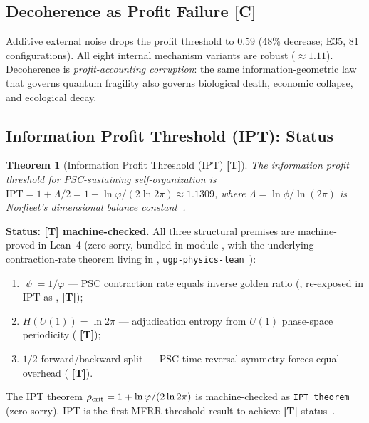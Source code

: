 \documentclass[11pt]{article}
\newcommand{\tagT}{\textbf{[T]}}
\newcommand{\tagC}{\textbf{[C]}}
\theoremstyle{plain}
\newtheorem{theorem}{Theorem}[section]
\theoremstyle{definition}
\theoremstyle{remark}
\begin{document}
\subsection{Decoherence as Profit Failure \tagC{}}

Additive external noise drops the profit threshold to 0.59 (48\% decrease; E35, 81 configurations).
All eight internal mechanism variants are robust ($\approx 1.11$).
Decoherence is \emph{profit-accounting corruption}: the same information-geometric law
that governs quantum fragility also governs biological death, economic collapse, and ecological decay.

\subsection{Information Profit Threshold (IPT): Status}

\begin{theorem}[Information Profit Threshold (IPT) \textup{\tagT{}}]
\label{conj:IPT}
The information profit threshold for PSC-sustaining self-organization is
$\mathrm{IPT} = 1 + \Lambda/2 = 1 + \ln\varphi/(2\ln 2\pi) \approx 1.1309$,
where $\Lambda = \ln\phi/\ln(2\pi)$ is Norfleet's dimensional balance constant~\cite{NorfleetPrivComm}.
\end{theorem}

\noindent\textbf{Status: \tagT{} machine-checked.}
All three structural premises are machine-proved in Lean~4
(zero sorry, bundled in module
,
with the underlying contraction-rate theorem living in
,
\texttt{ugp-physics-lean}~\cite{ugp-physics-lean}):
\begin{enumerate}[nosep,label=(A\arabic*)]
\item $|\psi| = 1/\varphi$ --- PSC contraction rate equals inverse golden ratio
  (,
  re-exposed in IPT as , \tagT{});
\item $H(U(1)) = \ln 2\pi$ --- adjudication entropy from $U(1)$ phase-space periodicity ( \tagT{});
\item $1/2$ forward/backward split --- PSC time-reversal symmetry forces equal overhead ( \tagT{}).
\end{enumerate}
The IPT theorem $\rho_{\rm crit} = 1 + \ln\varphi/(2\ln 2\pi)$ is machine-checked as \texttt{IPT\_theorem} (zero sorry). IPT is the first MFRR threshold result to achieve \tagT{} status~\cite{SpivackIPT}.
\end{document}
